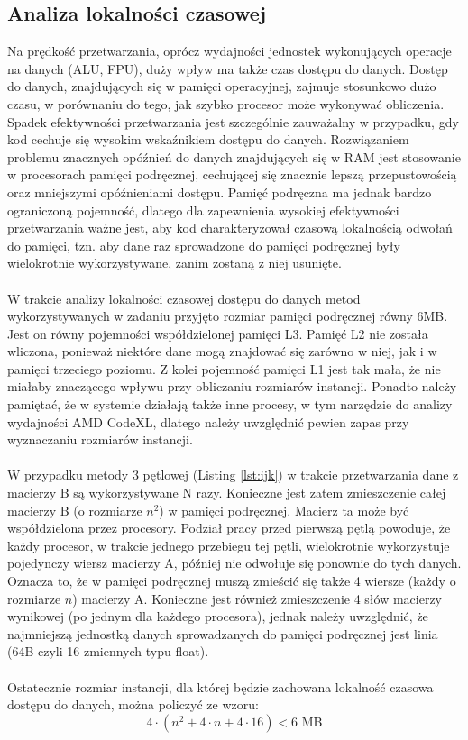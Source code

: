 \documentclass[12pt,a4paper]{article}
\begin{document}
\subsection{Analiza lokalności czasowej}

Na prędkość przetwarzania, oprócz wydajności jednostek wykonujących operacje na danych (ALU, FPU), duży wpływ ma także czas dostępu do danych. Dostęp do danych, znajdujących się w pamięci operacyjnej, zajmuje stosunkowo dużo czasu, w porównaniu do tego, jak szybko procesor może wykonywać obliczenia. Spadek efektywności przetwarzania jest szczególnie zauważalny w przypadku, gdy kod cechuje się wysokim wskaźnikiem dostępu do danych. Rozwiązaniem problemu znacznych opóźnień do danych znajdujących się w RAM jest stosowanie w procesorach pamięci podręcznej, cechującej się znacznie lepszą przepustowością oraz mniejszymi opóźnieniami dostępu. Pamięć podręczna ma jednak bardzo ograniczoną pojemność, dlatego dla zapewnienia wysokiej efektywności przetwarzania ważne jest, aby kod charakteryzował czasową lokalnością odwołań do pamięci, tzn. aby dane raz sprowadzone do pamięci podręcznej były wielokrotnie wykorzystywane, zanim zostaną z niej usunięte.\\
\\
W trakcie analizy lokalności czasowej dostępu do danych metod wykorzystywanych w zadaniu przyjęto rozmiar pamięci podręcznej równy 6MB. Jest on równy pojemności współdzielonej pamięci L3. Pamięć L2 nie została wliczona, ponieważ niektóre dane mogą znajdować się zarówno w niej, jak i w pamięci trzeciego poziomu. Z kolei pojemność pamięci L1 jest tak mała, że nie miałaby znaczącego wpływu przy obliczaniu rozmiarów instancji. Ponadto należy pamiętać, że w systemie działają także inne procesy, w tym narzędzie do analizy wydajności AMD CodeXL, dlatego należy uwzględnić pewien zapas przy wyznaczaniu rozmiarów instancji.\\
\\
W przypadku metody 3 pętlowej (Listing \ref{lst:ijk}) w trakcie przetwarzania dane z macierzy B są wykorzystywane N razy. Konieczne jest zatem zmieszczenie całej macierzy B (o rozmiarze $n^2$) w pamięci podręcznej. Macierz ta może być współdzielona przez procesory.
Podział pracy przed pierwszą pętlą powoduje, że każdy procesor, w trakcie jednego przebiegu tej pętli, wielokrotnie wykorzystuje pojedynczy wiersz macierzy A, później nie odwołuje się ponownie do tych danych. Oznacza to, że w pamięci podręcznej muszą zmieścić się także 4 wiersze (każdy o rozmiarze $n$) macierzy A.
Konieczne jest również zmieszczenie 4 słów macierzy wynikowej (po jednym dla każdego procesora), jednak należy uwzględnić, że najmniejszą jednostką danych sprowadzanych do pamięci podręcznej jest linia (64B czyli 16 zmiennych typu float).\\
\\
Ostatecznie rozmiar instancji, dla której będzie zachowana lokalność czasowa dostępu do danych, można policzyć ze wzoru:
\begin{equation}
4 \cdot \left( n^2 + 4\cdot n + 4 \cdot 16 \right) < 6 \text{ MB}
\end{equation}
\end{document}
